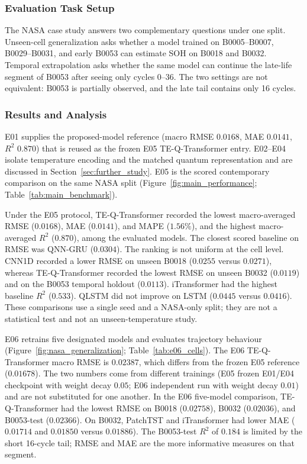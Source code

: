 \documentclass[a4paper,fleqn]{cas-sc}
\begin{document}
\subsubsection{Evaluation Task Setup}
\label{sec:nasa_task_setup}

The NASA case study answers two complementary questions under one split. Unseen-cell generalization asks whether a model trained on B0005--B0007, B0029--B0031, and early B0053 can estimate SOH on B0018 and B0032. Temporal extrapolation asks whether the same model can continue the late-life segment of B0053 after seeing only cycles 0--36. The two settings are not equivalent: B0053 is partially observed, and the late tail contains only 16 cycles.

\subsubsection{Results and Analysis}
\label{sec:nasa_results}

E01 supplies the proposed-model reference (macro RMSE $0.0168$, MAE $0.0141$, $R^2$ $0.870$) that is reused as the frozen E05 TE-Q-Transformer entry. E02--E04 isolate temperature encoding and the matched quantum representation and are discussed in Section~\ref{sec:further_study}. E05 is the scored contemporary comparison on the same NASA split (Figure~\ref{fig:main_performance}; Table~\ref{tab:main_benchmark}).

Under the E05 protocol, TE-Q-Transformer recorded the lowest macro-averaged RMSE ($0.0168$), MAE ($0.0141$), and MAPE ($1.56\%$), and the highest macro-averaged $R^2$ ($0.870$), among the evaluated models. The closest scored baseline on RMSE was QNN-GRU ($0.0304$). The ranking is not uniform at the cell level. CNN1D recorded a lower RMSE on unseen B0018 ($0.0255$ versus $0.0271$), whereas TE-Q-Transformer recorded the lowest RMSE on unseen B0032 ($0.0119$) and on the B0053 temporal holdout ($0.0113$). iTransformer had the highest baseline $R^2$ ($0.533$). QLSTM did not improve on LSTM ($0.0445$ versus $0.0416$). These comparisons use a single seed and a NASA-only split; they are not a statistical test and not an unseen-temperature study.

E06 retrains five designated models and evaluates trajectory behaviour (Figure~\ref{fig:nasa_generalization}; Table~\ref{tab:e06_cells}). The E06 TE-Q-Transformer macro RMSE is $0.02387$, which differs from the frozen E05 reference ($0.01678$). The two numbers come from different trainings (E05 frozen E01/E04 checkpoint with weight decay $0.05$; E06 independent run with weight decay $0.01$) and are not substituted for one another. In the E06 five-model comparison, TE-Q-Transformer had the lowest RMSE on B0018 ($0.02758$), B0032 ($0.02036$), and B0053-test ($0.02366$). On B0032, PatchTST and iTransformer had lower MAE ($0.01714$ and $0.01850$ versus $0.01886$). The B0053-test $R^2$ of $0.184$ is limited by the short 16-cycle tail; RMSE and MAE are the more informative measures on that segment.
\end{document}
